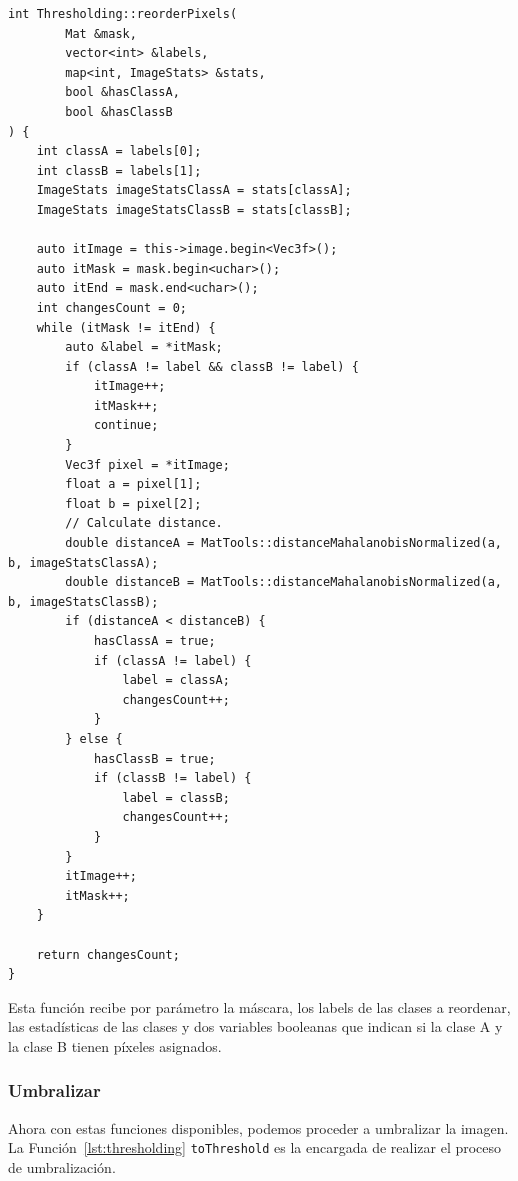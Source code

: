 \begin{lstlisting}[float=H,caption={Reorder Pixels},label={lst:reorder_pixels}]
int Thresholding::reorderPixels(
        Mat &mask,
        vector<int> &labels,
        map<int, ImageStats> &stats,
        bool &hasClassA,
        bool &hasClassB
) {
    int classA = labels[0];
    int classB = labels[1];
    ImageStats imageStatsClassA = stats[classA];
    ImageStats imageStatsClassB = stats[classB];

    auto itImage = this->image.begin<Vec3f>();
    auto itMask = mask.begin<uchar>();
    auto itEnd = mask.end<uchar>();
    int changesCount = 0;
    while (itMask != itEnd) {
        auto &label = *itMask;
        if (classA != label && classB != label) {
            itImage++;
            itMask++;
            continue;
        }
        Vec3f pixel = *itImage;
        float a = pixel[1];
        float b = pixel[2];
        // Calculate distance.
        double distanceA = MatTools::distanceMahalanobisNormalized(a, b, imageStatsClassA);
        double distanceB = MatTools::distanceMahalanobisNormalized(a, b, imageStatsClassB);
        if (distanceA < distanceB) {
            hasClassA = true;
            if (classA != label) {
                label = classA;
                changesCount++;
            }
        } else {
            hasClassB = true;
            if (classB != label) {
                label = classB;
                changesCount++;
            }
        }
        itImage++;
        itMask++;
    }

    return changesCount;
}
\end{lstlisting}

Esta función recibe por parámetro la máscara, los labels de las clases a reordenar, las estadísticas de las clases y dos variables booleanas que indican si la clase A y la clase B tienen píxeles asignados.

\subsubsection{Umbralizar}\label{subsubsec:thresholding}

Ahora con estas funciones disponibles, podemos proceder a umbralizar la imagen.
La Función~\ref{lst:thresholding} \texttt{toThreshold} es la encargada de realizar el proceso de umbralización.

